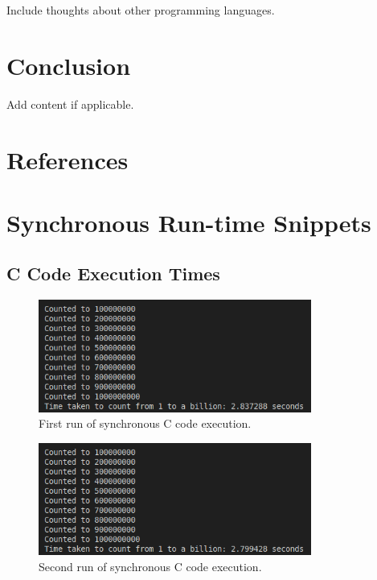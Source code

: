 \documentclass{article}
\begin{document}
Include thoughts about other programming languages.

\section{Conclusion}

Add content if applicable.

\newpage
\section{References}
\printbibliography

\appendix

\section{Synchronous Run-time Snippets}

\subsection{C Code Execution Times} 

\begin{figure}[htbp]
    \centering
    \includegraphics[width=0.8\textwidth]{../records/results_c/result_1.png}
    \caption{First run of synchronous C code execution.}
    \label{fig:C-runtime-1}
\end{figure}

\begin{figure}[htbp]
    \centering
    \includegraphics[width=0.8\textwidth]{../records/results_c/result_2.png}
    \caption{Second run of synchronous C code execution.}
    \label{fig:C-runtime-2}
\end{figure}
\end{document}
